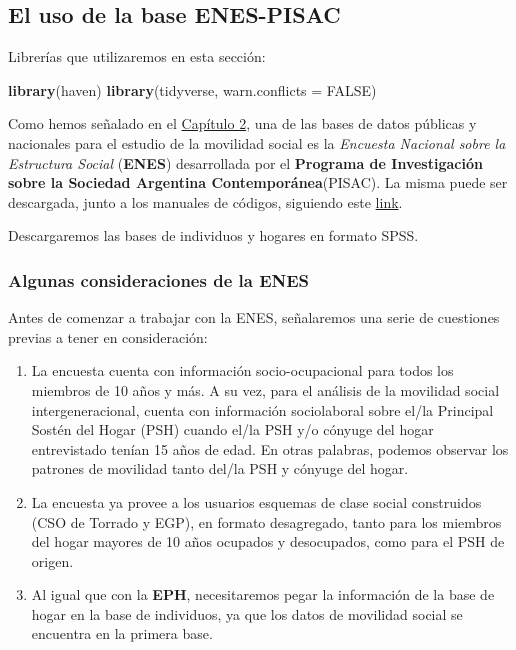 \documentclass[
]{article}
\newenvironment{Shaded}{\begin{snugshade}}{\end{snugshade}}
\newcommand{\AttributeTok}[1]{\textcolor[rgb]{0.13,0.29,0.53}{#1}}
\newcommand{\ConstantTok}[1]{\textcolor[rgb]{0.56,0.35,0.01}{#1}}
\newcommand{\FunctionTok}[1]{\textcolor[rgb]{0.13,0.29,0.53}{\textbf{#1}}}
\newcommand{\NormalTok}[1]{#1}
\begin{document}
\hypertarget{enes}{%
\subsection{El uso de la base ENES-PISAC}\label{enes}}

Librerías que utilizaremos en esta sección:

\begin{Shaded}
\begin{Highlighting}[]
\FunctionTok{library}\NormalTok{(haven)}
\FunctionTok{library}\NormalTok{(tidyverse, }\AttributeTok{warn.conflicts =} \ConstantTok{FALSE}\NormalTok{)}
\end{Highlighting}
\end{Shaded}

Como hemos señalado en el \protect\hyperlink{otras}{Capítulo 2}, una de las bases de datos públicas y nacionales para el estudio de la movilidad social es la \emph{Encuesta Nacional sobre la Estructura Social} (\textbf{ENES}) desarrollada por el \textbf{Programa de Investigación sobre la Sociedad Argentina Contemporánea}(PISAC). La misma puede ser descargada, junto a los manuales de códigos, siguiendo este \href{https://www.argentina.gob.ar/ciencia/pisac/bases-de-datos}{link}.

Descargaremos las bases de individuos y hogares en formato SPSS.

\hypertarget{algunas-consideraciones-de-la-enes}{%
\subsubsection{Algunas consideraciones de la ENES}\label{algunas-consideraciones-de-la-enes}}

Antes de comenzar a trabajar con la ENES, señalaremos una serie de cuestiones previas a tener en consideración:

\begin{enumerate}
\def\labelenumi{\arabic{enumi}.}
\item
  La encuesta cuenta con información socio-ocupacional para todos los miembros de 10 años y más. A su vez, para el análisis de la movilidad social intergeneracional, cuenta con información sociolaboral sobre el/la Principal Sostén del Hogar (PSH) cuando el/la PSH y/o cónyuge del hogar entrevistado tenían 15 años de edad. En otras palabras, podemos observar los patrones de movilidad tanto del/la PSH y cónyuge del hogar.
\item
  La encuesta ya provee a los usuarios esquemas de clase social construidos (CSO de Torrado y EGP), en formato desagregado, tanto para los miembros del hogar mayores de 10 años ocupados y desocupados, como para el PSH de origen.
\item
  Al igual que con la \textbf{EPH}, necesitaremos pegar la información de la base de hogar en la base de individuos, ya que los datos de movilidad social se encuentra en la primera base.
\end{enumerate}
\end{document}
